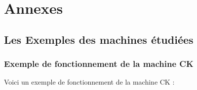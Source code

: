 \documentclass[10pt,a4paper]{article}
\begin{document}
		
		
	\section{Annexes}
		
		\subsection{Les Exemples des machines étudiées}
		
			\subsubsection{Exemple de fonctionnement de la machine CK}\label{CK}
			
				Voici un exemple de fonctionnement de la machine CK :
		
\end{document}

